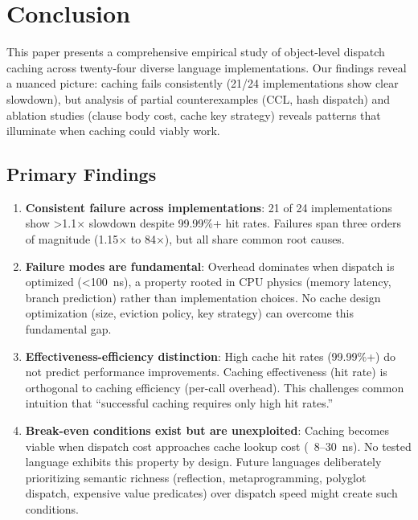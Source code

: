 \documentclass[sigplan,final,acmsmall,review,screen]{acmart}
\begin{document}
\section{Conclusion}

This paper presents a comprehensive empirical study of object-level dispatch caching across twenty-four diverse language implementations.
Our findings reveal a nuanced picture: caching fails consistently (21/24 implementations show clear slowdown), but analysis of partial
counterexamples (CCL, hash dispatch) and ablation studies (clause body cost, cache key strategy) reveals patterns that illuminate
when caching could viably work.

\subsection{Primary Findings}

\begin{enumerate}
  \item \textbf{Consistent failure across implementations}: 21 of 24 implementations show >1.1× slowdown despite 99.99\%+ hit rates.
    Failures span three orders of magnitude (1.15× to 84×), but all share common root causes.

  \item \textbf{Failure modes are fundamental}: Overhead dominates when dispatch is optimized (<100~ns), a property
    rooted in CPU physics (memory latency, branch prediction) rather than implementation choices. No cache design optimization
    (size, eviction policy, key strategy) can overcome this fundamental gap.

  \item \textbf{Effectiveness-efficiency distinction}: High cache hit rates (99.99\%+) do not predict performance improvements.
    Caching effectiveness (hit rate) is orthogonal to caching efficiency (per-call overhead). This challenges common intuition
    that ``successful caching requires only high hit rates.''

  \item \textbf{Break-even conditions exist but are unexploited}: Caching becomes viable when dispatch cost approaches cache lookup cost
    (~8--30~ns). No tested language exhibits this property by design. Future languages deliberately prioritizing semantic richness
    (reflection, metaprogramming, polyglot dispatch, expensive value predicates) over dispatch speed might create such conditions.
\end{enumerate}
\end{document}

